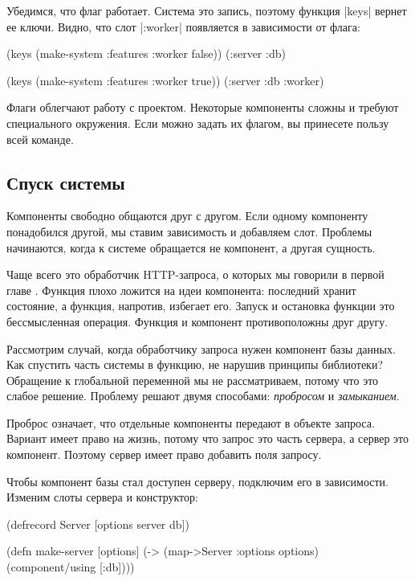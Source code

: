 Убедимся, что флаг работает. Система это запись, поэтому функция \spverb|keys|
вернет ее ключи. Видно, что слот \spverb|:worker| появляется в зависимости от
флага:

\begin{english}
  \begin{clojure}
(keys (make-system {:features {:worker false}}))
(:server :db)

(keys (make-system {:features {:worker true}}))
(:server :db :worker)
  \end{clojure}
\end{english}

Флаги облегчают работу с проектом. Некоторые компоненты сложны и требуют
специального окружения. Если можно задать их флагом, вы принесете пользу всей
команде.

\subsection{Спуск системы}

Компоненты свободно общаются друг с другом. Если одному компоненту понадобился
другой, мы ставим зависимость и добавляем слот. Проблемы начинаются, когда к
системе обращается не компонент, а другая сущность.

Чаще всего это обработчик HTTP-запроса, о которых мы говорили в первой
главе . Функция плохо ложится на идеи компонента: последний
хранит состояние, а функция, напротив, избегает его. Запуск и остановка функции
это бессмысленная операция. Функция и компонент противоположны друг другу.

Рассмотрим случай, когда обработчику запроса нужен компонент базы данных. Как
спустить часть системы в функцию, не нарушив принципы библиотеки? Обращение к
глобальной переменной мы не рассматриваем, потому что это слабое
решение. Проблему решают двумя способами: \emph{пробросом} и \emph{замыканием}.

Проброс означает, что отдельные компоненты передают в объекте запроса. Вариант
имеет право на жизнь, потому что запрос это часть сервера, а сервер это
компонент. Поэтому сервер имеет право добавить поля запросу.

Чтобы компонент базы стал доступен серверу, подключим его в зависимости. Изменим
слоты сервера и конструктор:

\begin{english}
  \begin{clojure}
(defrecord Server
  [options server db])

(defn make-server
  [options]
  (-> (map->Server {:options options})
      (component/using [:db])))
  \end{clojure}
\end{english}

